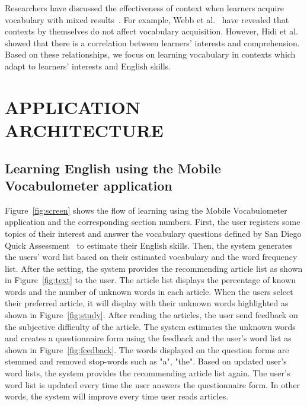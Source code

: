 \documentclass[sigchi]{acmart}
\begin{document}
Researchers have discussed the effectiveness of context when learners acquire vocabulary with mixed results~\cite{israel2017handbook,shintani2011comparative}. For example, Webb et al.~\cite{webb2007learning} have revealed that contexts by themselves do not affect vocabulary acquisition. However, Hidi et al.~\cite{hidi2001interest} showed that there is a correlation between learners' interests and comprehension. Based on these relationships, we focus on learning vocabulary in contexts which adapt to learners' interests and English skills.

\section{APPLICATION ARCHITECTURE}
\begin{comment}
\begin{figure}[!t]
    \centering
    \texttt{[image: ./fig/stats.eps]}
    \caption{Statistic view of learning records}
    \label{fig:stats}
\end{figure}
\end{comment}
\subsection{Learning English using the Mobile Vocabulometer application}
Figure~\ref{fig:screen} shows the flow of learning using the Mobile Vocabulometer application and the corresponding section numbers. First, the user registers some topics of their interest and answer the vocabulary questions defined by San Diego Quick Assessment~\cite{la1969graded} to estimate their English skills. Then, the system generates the users' word list based on their estimated vocabulary and the word frequency list. After the setting, the system provides the recommending article list as shown in Figure~\ref{fig:text} to the user. The article list displays the percentage of known words and the number of unknown words in each article. When the users select their preferred article, it will display with their unknown words highlighted as shown in Figure~\ref{fig:study}. After reading the articles, the user send feedback on the subjective difficulty of the article. The system estimates the unknown words and creates a questionnaire form using the feedback and the user's word list as shown in Figure~\ref{fig:feedback}. The words displayed on the question forms are stemmed and removed stop-words such as "a", "the". Based on updated user's word lists, the system provides the recommending article list again. The user's word list is updated every time the user answers the questionnaire form. In other words, the system will improve every time user reads articles.
\end{document}
